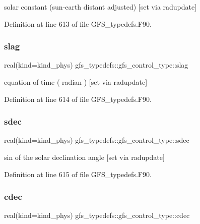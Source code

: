 solar constant (sun-\/earth distant adjusted) [set via radupdate] 



Definition at line 613 of file G\+F\+S\+\_\+typedefs.\+F90.

\mbox{\label{structgfs__typedefs_1_1gfs__control__type_ad3ae1fb96ed26612c3a5d25177ae6cf8}} 
\subsubsection{slag}
{\footnotesize\ttfamily real(kind=kind\+\_\+phys) gfs\+\_\+typedefs\+::gfs\+\_\+control\+\_\+type\+::slag}



equation of time ( radian ) [set via radupdate] 



Definition at line 614 of file G\+F\+S\+\_\+typedefs.\+F90.

\mbox{\label{structgfs__typedefs_1_1gfs__control__type_ac97f540dad9455091e9490b5856f1e46}} 
\subsubsection{sdec}
{\footnotesize\ttfamily real(kind=kind\+\_\+phys) gfs\+\_\+typedefs\+::gfs\+\_\+control\+\_\+type\+::sdec}



sin of the solar declination angle [set via radupdate] 



Definition at line 615 of file G\+F\+S\+\_\+typedefs.\+F90.

\mbox{\label{structgfs__typedefs_1_1gfs__control__type_a9a4858a415334db6e696d54473025ac1}} 
\subsubsection{cdec}
{\footnotesize\ttfamily real(kind=kind\+\_\+phys) gfs\+\_\+typedefs\+::gfs\+\_\+control\+\_\+type\+::cdec}



